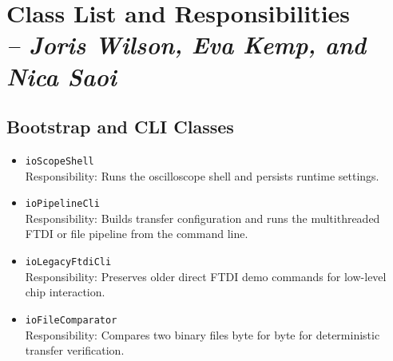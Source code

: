 \section{Class List and Responsibilities \\
\small{\textit{-- Joris Wilson, Eva Kemp, and Nica Saoi}}}
\label{Section::Class List and Responsibilities}

\subsection{Bootstrap and CLI Classes}
\begin{itemize}
    \item \texttt{ioScopeShell} \\
    Responsibility: Runs the oscilloscope shell and persists runtime settings.

    \item \texttt{ioPipelineCli} \\
    Responsibility: Builds transfer configuration and runs the multithreaded FTDI or file pipeline from the command line.

    \item \texttt{ioLegacyFtdiCli} \\
    Responsibility: Preserves older direct FTDI demo commands for low-level chip interaction.

    \item \texttt{ioFileComparator} \\
    Responsibility: Compares two binary files byte for byte for deterministic transfer verification.
\end{itemize}

